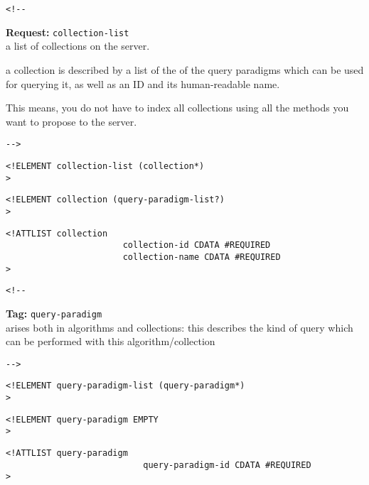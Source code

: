 \documentclass{article}
\newcommand{\requesttitle}[1]{\textbf{Request: }{\texttt{#1}}\\}
\newcommand{\tagtitle}[1]{\textbf{Tag: }{\texttt{#1}}\\}
\begin{document}
\begin{verbatim}<!--\end{verbatim}
    
  
     \requesttitle{collection-list}

     a list of collections on the server.

     a collection is described by a list of the
     of the query paradigms which can be used
     for querying it, as well as an ID and its
     human-readable name.

     This means, you do not have to index all collections using all
     the methods you want to propose to the server.

        
 \begin{verbatim}-->\end{verbatim}



\begin{verbatim}
<!ELEMENT collection-list (collection*) 
>\end{verbatim}

\begin{verbatim}
<!ELEMENT collection (query-paradigm-list?) 
>\end{verbatim}

\begin{verbatim}
<!ATTLIST collection 
                       collection-id CDATA #REQUIRED
                       collection-name CDATA #REQUIRED
>\end{verbatim}

\begin{verbatim}<!--\end{verbatim}
  

     \tagtitle{query-paradigm}
     arises both in algorithms and collections:
     this describes the kind of query which can
     be performed with this algorithm/collection 

       
 \begin{verbatim}-->\end{verbatim}



\begin{verbatim}
<!ELEMENT query-paradigm-list (query-paradigm*) 
>\end{verbatim}

\begin{verbatim}
<!ELEMENT query-paradigm EMPTY 
>\end{verbatim}

\begin{verbatim}
<!ATTLIST query-paradigm 
                           query-paradigm-id CDATA #REQUIRED
>\end{verbatim}
\end{document}
